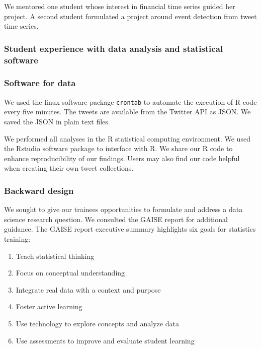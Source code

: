 \documentclass[
]{article}
\providecommand{\tightlist}{%
  \setlength{\itemsep}{0pt}\setlength{\parskip}{0pt}}
\begin{document}
We mentored one student whose interest in financial time series guided
her project. A second student formulated a project around event
detection from tweet time series.

\hypertarget{student-experience-with-data-analysis-and-statistical-software}{%
\subsubsection{Student experience with data analysis and statistical
software}\label{student-experience-with-data-analysis-and-statistical-software}}

\hypertarget{software-for-data}{%
\subsubsection{Software for data}\label{software-for-data}}

We used the linux software package \texttt{crontab} to automate the
execution of R code every five minutes. The tweets are available from
the Twitter API as JSON. We saved the JSON in plain text files.

We performed all analyses in the R statistical computing environment. We
used the Rstudio software package to interface with R. We share our R
code to enhance reproducibility of our findings. Users may also find our
code helpful when creating their own tweet collections.

\hypertarget{backward-design}{%
\subsubsection{Backward design}\label{backward-design}}

We sought to give our trainees opportunities to formulate and address a
data science research question. We consulted the GAISE report for
additional guidance. The GAISE report executive summary highlights six
goals for statistics training:

\begin{enumerate}
\def\labelenumi{\arabic{enumi}.}
\tightlist
\item
  Teach statistical thinking\\
\item
  Focus on conceptual understanding\\
\item
  Integrate real data with a context and purpose\\
\item
  Foster active learning\\
\item
  Use technology to explore concepts and analyze data\\
\item
  Use assessments to improve and evaluate student learning
\end{enumerate}
\end{document}
